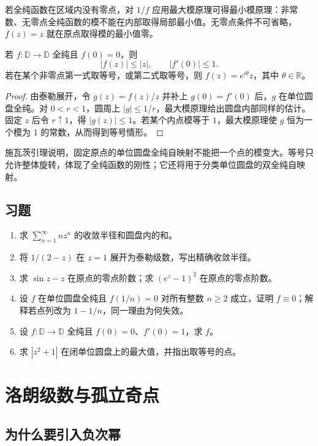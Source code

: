 \documentclass[UTF8,12pt,a4paper,fontset=fandol]{ctexbook}
\begin{document}
若全纯函数在区域内没有零点，对 $1/f$ 应用最大模原理可得最小模原理：非常数、无零点全纯函数的模不能在内部取得局部最小值。无零点条件不可省略，$f(z)=z$ 就在原点取得模的最小值零。

\begin{theorem}[施瓦茨引理]
\label{thm:cv-schwarz}
若 $f:\mathbb D\to\mathbb D$ 全纯且 $f(0)=0$，则
\[
 |f(z)|\le|z|,\qquad |f'(0)|\le1.
\]
若在某个非零点第一式取等号，或第二式取等号，则 $f(z)=e^{i\theta}z$，其中 $\theta\in\mathbb R$。
\end{theorem}
\begin{proof}
由泰勒展开，令 $g(z)=f(z)/z$ 并补上 $g(0)=f'(0)$ 后，$g$ 在单位圆盘全纯。对 $0<r<1$，圆周上 $|g|\le1/r$，最大模原理给出圆盘内部同样的估计。固定 $z$ 后令 $r\uparrow1$，得 $|g(z)|\le1$。若某个内点模等于 $1$，最大模原理使 $g$ 恒为一个模为 $1$ 的常数，从而得到等号情形。
\end{proof}

施瓦茨引理说明，固定原点的单位圆盘全纯自映射不能把一个点的模变大。等号只允许整体旋转，体现了全纯函数的刚性；它还将用于分类单位圆盘的双全纯自映射。

\section{习题}
\label{sec:cv-series-ex}
\begin{enumerate}
 \item 求 $\sum_{n=1}^\infty n z^n$ 的收敛半径和圆盘内的和。
 \item 将 $1/(2-z)$ 在 $z=1$ 展开为泰勒级数，写出精确收敛半径。
 \item 求 $\sin z-z$ 在原点的零点阶数；求 $(e^z-1)^2$ 在原点的零点阶数。
 \item 设 $f$ 在单位圆盘全纯且 $f(1/n)=0$ 对所有整数 $n\ge2$ 成立，证明 $f\equiv0$；解释若点列改为 $1-1/n$，同一理由为何失效。
 \item 设 $f:\mathbb D\to\mathbb D$ 全纯且 $f(0)=0$、$f'(0)=1$，求 $f$。
 \item 求 $|z^2+1|$ 在闭单位圆盘上的最大值，并指出取等号的点。
\end{enumerate}

\chapter{洛朗级数与孤立奇点}
\label{chap:cv-laurent}

\section{为什么要引入负次幂}
\end{document}

